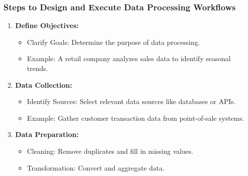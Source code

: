 \documentclass[aspectratio=169]{beamer}
\begin{document}
\begin{frame}[fragile]
    \frametitle{Steps to Design and Execute Data Processing Workflows}
    \begin{enumerate}
        \item \textbf{Define Objectives:}
        \begin{itemize}
            \item Clarify Goals: Determine the purpose of data processing.
            \item Example: A retail company analyzes sales data to identify seasonal trends.
        \end{itemize}

        \item \textbf{Data Collection:}
        \begin{itemize}
            \item Identify Sources: Select relevant data sources like databases or APIs.
            \item Example: Gather customer transaction data from point-of-sale systems.
        \end{itemize}

        \item \textbf{Data Preparation:}
        \begin{itemize}
            \item Cleaning: Remove duplicates and fill in missing values.
            \item Transformation: Convert and aggregate data.
        \end{itemize}
    \end{enumerate}
\end{frame}
\end{document}
